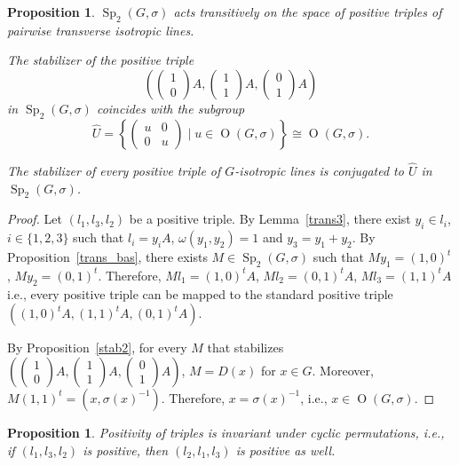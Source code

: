 \documentclass[a4paper,oneside,11pt]{amsart}
\DeclareMathOperator{\Sp}{Sp}
\DeclareMathOperator{\OO}{O}
\theoremstyle{plain}
\newtheorem{prop}[teo]{Proposition}
\theoremstyle{definition}
\theoremstyle{remark}
\begin{document}
\begin{prop}\label{stab3} $\Sp_2(G,\sigma)$ acts transitively on the space of positive triples of pairwise transverse isotropic lines.

The stabilizer of the positive triple
$$\left(\begin{pmatrix}1 \\ 0\end{pmatrix}A,\begin{pmatrix}1 \\ 1\end{pmatrix}A,\begin{pmatrix}0 \\ 1\end{pmatrix}A\right)$$
in $\Sp_2(G,\sigma)$ coincides with the subgroup
$$\hat U=\left\{
\begin{pmatrix}
u & 0 \\
0 & u
\end{pmatrix}
\mid u\in \OO(G,\sigma)\right\}\cong \OO(G,\sigma).$$

The stabilizer of every positive triple of $G$-isotropic lines is conjugated to $\hat U$ in $\Sp_2(G,\sigma)$.
\end{prop}

\begin{proof} Let $(l_1,l_3,l_2)$ be a positive triple. By Lemma~\ref{trans3}, there exist $y_i\in l_i$, $i\in\{1,2,3\}$ such that $l_i=y_iA$, $\omega(y_1,y_2)=1$ and $y_3=y_1+y_2$. By Proposition~\ref{trans_bas}, there exists $M\in\Sp_2(G,\sigma)$ such that $My_1=(1,0)^t$, $My_2=(0,1)^t$. Therefore, $Ml_1=(1,0)^tA$, $Ml_2=(0,1)^tA$, $Ml_3=(1,1)^tA$ i.e., every positive triple can be mapped to the standard positive triple $((1,0)^tA,(1,1)^tA,(0,1)^tA)$.

By Proposition~\ref{stab2}, for every $M$ that stabilizes $\left(\begin{pmatrix}1 \\ 0\end{pmatrix}A,\begin{pmatrix}1 \\ 1\end{pmatrix}A,\begin{pmatrix}0 \\ 1\end{pmatrix}A\right)$, $M=D(x)$ for $x\in G$. Moreover, $M(1,1)^t=(x,\sigma(x)^{-1})$. Therefore, $x=\sigma(x)^{-1}$, i.e., $x\in \OO(G,\sigma)$.
\end{proof}

\begin{prop}
Positivity of triples is invariant under cyclic permutations, i.e., if $(l_1,l_3,l_2)$ is positive, then $(l_2,l_1,l_3)$ is positive as well.
\end{prop}
\end{document}
